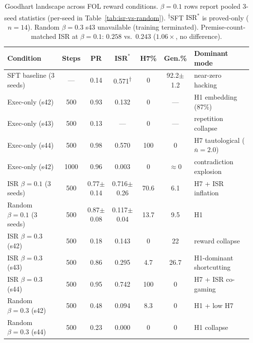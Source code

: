\begin{table}[t]
\centering\small
\begin{tabular}{lcccccl}
\toprule
\textbf{Condition} & \textbf{Steps} & \textbf{PR} & $\mathbf{ISR}^*$ & \textbf{H7\%} & \textbf{Gen.\%} & \textbf{Dominant mode} \\
\midrule
SFT baseline (3 seeds)           & ---  & 0.14 & 0.571\textsuperscript{$\dagger$} & 0     & 92.2{\small$\pm$}1.2 & near-zero hacking \\
\midrule
Exec-only (s42)                  & 500  & 0.93 & 0.132 & 0     & ---   & H1 embedding (87\%) \\
Exec-only (s43)                  & 500  & 0.13 & ---   & 0     & ---   & repetition collapse \\
Exec-only (s44)                  & 500  & 0.98 & 0.570 & 100   & 0     & H7 tautological ($\bar{n}{=}2.0$) \\
Exec-only (s42)                  & 1000 & 0.96 & 0.003 & 0     & ${\approx}$0 & contradiction explosion \\
\midrule
ISR $\beta{=}0.1$ (3 seeds)     & 500  & 0.77{\small$\pm$}0.14 & 0.716{\small$\pm$}0.26 & 70.6  & 6.1  & H7 + ISR inflation \\
Random $\beta{=}0.1$ (3 seeds)  & 500  & 0.87{\small$\pm$}0.08 & 0.117{\small$\pm$}0.04 & 13.7  & 9.5  & H1 \\
\midrule
ISR $\beta{=}0.3$ (s42)         & 500  & 0.18 & 0.143 & 0     & 22    & reward collapse \\
ISR $\beta{=}0.3$ (s43)         & 500  & 0.86 & 0.295 & 4.7   & 26.7  & H1-dominant shortcutting \\
ISR $\beta{=}0.3$ (s44)         & 500  & 0.95 & 0.742 & 100   & 0     & H7 + ISR co-gaming \\
Random $\beta{=}0.3$ (s42)      & 500  & 0.48 & 0.094 & 8.3   & 0     & H1 + low H7 \\
Random $\beta{=}0.3$ (s44)      & 500  & 0.23 & 0.000 & 0     & 0     & H1 collapse \\
\bottomrule
\end{tabular}
\caption{Goodhart landscape across FOL reward conditions.
$\beta{=}0.1$ rows report pooled 3-seed statistics (per-seed in Table~\ref{tab:isr-vs-random}).
\textsuperscript{$\dagger$}SFT $\mathrm{ISR}^*$ is proved-only ($n{=}14$).
Random $\beta{=}0.3$ s43 unavailable (training terminated).
Premise-count-matched ISR at $\beta{=}0.1$: $0.258$ vs.\ $0.243$ ($1.06\times$, no difference).}
\label{tab:goodhart-landscape}
\end{table}

